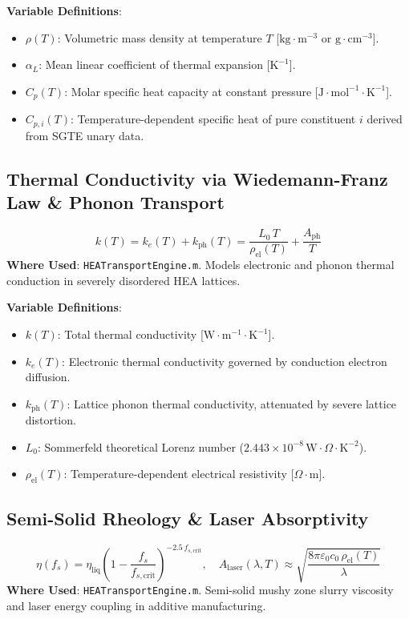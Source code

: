 \documentclass[11pt,a4paper]{article}
\begin{document}
\noindent\textbf{Variable Definitions}:
\begin{itemize}
  \item $\rho(T)$: Volumetric mass density at temperature $T$ [$\text{kg}\cdot\text{m}^{-3}$ or $\text{g}\cdot\text{cm}^{-3}$].
  \item $\alpha_L$: Mean linear coefficient of thermal expansion [$\text{K}^{-1}$].
  \item $C_p(T)$: Molar specific heat capacity at constant pressure [$\text{J}\cdot\text{mol}^{-1}\cdot\text{K}^{-1}$].
  \item $C_{p, i}(T)$: Temperature-dependent specific heat of pure constituent $i$ derived from SGTE unary data.
\end{itemize}

\subsection{Thermal Conductivity via Wiedemann-Franz Law \& Phonon Transport}
\begin{equation}
k(T) = k_e(T) + k_{\text{ph}}(T) = \frac{L_0 \, T}{\rho_{\text{el}}(T)} + \frac{A_{\text{ph}}}{T}
\end{equation}
\textbf{Where Used}: \texttt{HEATransportEngine.m}. Models electronic and phonon thermal conduction in severely disordered HEA lattices.

\noindent\textbf{Variable Definitions}:
\begin{itemize}
  \item $k(T)$: Total thermal conductivity [$\text{W}\cdot\text{m}^{-1}\cdot\text{K}^{-1}$].
  \item $k_e(T)$: Electronic thermal conductivity governed by conduction electron diffusion.
  \item $k_{\text{ph}}(T)$: Lattice phonon thermal conductivity, attenuated by severe lattice distortion.
  \item $L_0$: Sommerfeld theoretical Lorenz number ($2.443 \times 10^{-8} \, \text{W}\cdot\Omega\cdot\text{K}^{-2}$).
  \item $\rho_{\text{el}}(T)$: Temperature-dependent electrical resistivity [$\Omega\cdot\text{m}$].
\end{itemize}

\subsection{Semi-Solid Rheology \& Laser Absorptivity}
\begin{equation}
\eta(f_s) = \eta_{\text{liq}} \left(1 - \frac{f_s}{f_{s, \text{crit}}}\right)^{-2.5 \, f_{s, \text{crit}}}, \quad A_{\text{laser}}(\lambda, T) \approx \sqrt{\frac{8 \pi \varepsilon_0 c_0 \, \rho_{\text{el}}(T)}{\lambda}}
\end{equation}
\textbf{Where Used}: \texttt{HEATransportEngine.m}. Semi-solid mushy zone slurry viscosity and laser energy coupling in additive manufacturing.
\end{document}
